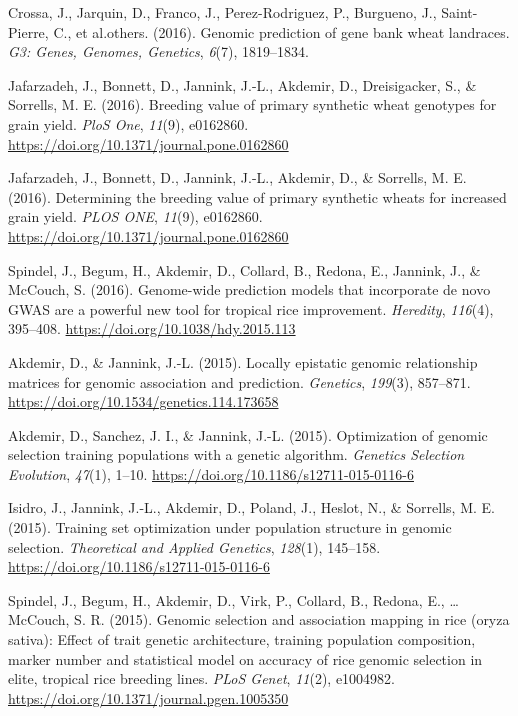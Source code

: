 \documentclass[11pt,a4paper,]{moderncv}
\newlength{\cslhangindent}
\newenvironment{CSLReferences}[2] %
 {\begin{list}{}{%
  \setlength{\itemindent}{0pt}
  \setlength{\leftmargin}{0pt}
  \setlength{\parsep}{0pt}
  \ifodd #1
   \setlength{\leftmargin}{\cslhangindent}
   \setlength{\itemindent}{-1\cslhangindent}
  \fi
  \setlength{\itemsep}{#2\baselineskip}}}
 {\end{list}}
\begin{document}
\begin{CSLReferences}{1}{0}
Crossa, J., Jarquin, D., Franco, J., Perez-Rodriguez, P., Burgueno, J.,
Saint-Pierre, C., et al.others. (2016). Genomic prediction of gene bank
wheat landraces. \emph{G3: Genes, Genomes, Genetics}, \emph{6}(7),
1819--1834.

Jafarzadeh, J., Bonnett, D., Jannink, J.-L., Akdemir, D., Dreisigacker,
S., \& Sorrells, M. E. (2016). Breeding value of primary synthetic wheat
genotypes for grain yield. \emph{PloS One}, \emph{11}(9), e0162860.
\url{https://doi.org/10.1371/journal.pone.0162860}

Jafarzadeh, J., Bonnett, D., Jannink, J.-L., Akdemir, D., \& Sorrells,
M. E. (2016). Determining the breeding value of primary synthetic wheats
for increased grain yield. \emph{PLOS ONE}, \emph{11}(9), e0162860.
\url{https://doi.org/10.1371/journal.pone.0162860}

Spindel, J., Begum, H., Akdemir, D., Collard, B., Redona, E., Jannink,
J., \& McCouch, S. (2016). Genome-wide prediction models that
incorporate de novo GWAS are a powerful new tool for tropical rice
improvement. \emph{Heredity}, \emph{116}(4), 395--408.
\url{https://doi.org/10.1038/hdy.2015.113}

Akdemir, D., \& Jannink, J.-L. (2015). Locally epistatic genomic
relationship matrices for genomic association and prediction.
\emph{Genetics}, \emph{199}(3), 857--871.
\url{https://doi.org/10.1534/genetics.114.173658}

Akdemir, D., Sanchez, J. I., \& Jannink, J.-L. (2015). Optimization of
genomic selection training populations with a genetic algorithm.
\emph{Genetics Selection Evolution}, \emph{47}(1), 1--10.
\url{https://doi.org/10.1186/s12711-015-0116-6}

Isidro, J., Jannink, J.-L., Akdemir, D., Poland, J., Heslot, N., \&
Sorrells, M. E. (2015). Training set optimization under population
structure in genomic selection. \emph{Theoretical and Applied Genetics},
\emph{128}(1), 145--158. \url{https://doi.org/10.1186/s12711-015-0116-6}

Spindel, J., Begum, H., Akdemir, D., Virk, P., Collard, B., Redona, E.,
\ldots{} McCouch, S. R. (2015). Genomic selection and association
mapping in rice (oryza sativa): Effect of trait genetic architecture,
training population composition, marker number and statistical model on
accuracy of rice genomic selection in elite, tropical rice breeding
lines. \emph{PLoS Genet}, \emph{11}(2), e1004982.
\url{https://doi.org/10.1371/journal.pgen.1005350}


\end{CSLReferences}
\end{document}
